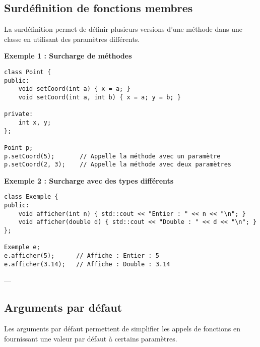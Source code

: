 \subsection{ Surdéfinition de fonctions membres}
La surdéfinition permet de définir plusieurs versions d’une méthode dans une classe en utilisant des paramètres différents.

\textbf{Exemple 1 : Surcharge de méthodes}
\begin{tcolorbox}[colframe=blue!50!black, colback=blue!5!white, title=Exemple d'Attributs et Méthodes Statistiques, float=htb]
\begin{verbatim}
class Point {
public:
    void setCoord(int a) { x = a; }
    void setCoord(int a, int b) { x = a; y = b; }

private:
    int x, y;
};

Point p;
p.setCoord(5);       // Appelle la méthode avec un paramètre
p.setCoord(2, 3);    // Appelle la méthode avec deux paramètres
\end{verbatim}
\end{tcolorbox}
\textbf{Exemple 2 : Surcharge avec des types différents}
\begin{tcolorbox}[colframe=blue!50!black, colback=blue!5!white, title=Exemple d'Attributs et Méthodes Statistiques, float=htb]
\begin{verbatim}
class Exemple {
public:
    void afficher(int n) { std::cout << "Entier : " << n << "\n"; }
    void afficher(double d) { std::cout << "Double : " << d << "\n"; }
};

Exemple e;
e.afficher(5);      // Affiche : Entier : 5
e.afficher(3.14);   // Affiche : Double : 3.14
\end{verbatim}
\end{tcolorbox}
---

\subsection{ Arguments par défaut}
Les arguments par défaut permettent de simplifier les appels de fonctions en fournissant une valeur par défaut à certains paramètres.

